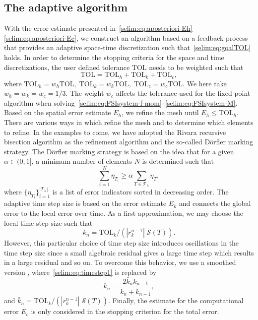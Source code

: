 \subsection{The adaptive algorithm}

With the \apost{} error estimate presented
in~\eqref{selim:eq:aposteriori-Eh}--\eqref{selim:eq:aposteriori-Ec}, we construct an algorithm based on a
feedback process that provides an adaptive space-time discretization
such that~\eqref{selim:eq:goalTOL} holds. In order to determine the
stopping criteria for the space and time discretizations, the user
defined tolerance $\mathrm{TOL}$ needs to be weighted such that
\begin{equation}
\mathrm{TOL} = \mathrm{TOL}_h + \mathrm{TOL}_k + \mathrm{TOL}_c,
\end{equation}
where $\mathrm{TOL}_h = w_h \mathrm{TOL}, \;\mathrm{TOL}_k = w_k
\mathrm{TOL}, \;\mathrm{TOL}_c = w_c \mathrm{TOL}$.  We here take $w_h
= w_k = w_c = 1/3$. The weight $w_c$ affects the tolerance used for
the fixed point algorithm when
solving~\eqref{selim:eq:FSIsystem-f-mom}--\eqref{selim:eq:FSIsystem-M}. Based on the spatial error
estimate $E_h$, we refine the mesh until $E_h \leqslant \mathrm{TOL}_h$.
There are various ways in which refine the mesh and to determine which
elements to refine. In the examples to come, we have adopted the
Rivara recursive bisection algorithm as the refinement algorithm
and the so-called
D\"{o}rfler \citep{Dorfler1996} marking strategy. The D\"{o}rfler
marking strategy is based on the idea that for a given
$\alpha\in(0,1]$, a minimum number of elements $N$ is determined
such that
\begin{equation}
  \label{selim:eq:dorfler}
\sum_{i=1}^{N}\eta_{T_i} \geqslant  \alpha \sum_{T\in\mathcal{T}_h}\eta_T ,
\end{equation}
where $\{ \eta_{T_{i}}\}_{i = 1}^{|\mathcal{T}_h|}$ is a list of error
indicators sorted in decreasing order. The adaptive time step size is
based on the error estimate $E_k$ and connects the global error to the
local error over time. As a first approximation, we may choose the
local time step size such that
\begin{equation}
\label{selim:eq:timestep1}
k_n = \mathrm{TOL}_k /(| r_k^{n-1} |\; \mathcal{S}(T)).
\end{equation}
However, this particular choice of time step size introduces
oscillations in the time step size since a small algebraic residual
gives a large time step which results in a large residual and so
on. To overcome this behavior, we use a smoothed
version \citep{Logg2004}, where~\eqref{selim:eq:timestep1} is replaced
by
\begin{equation}
\label{selim:eq:timestep2}
k_n = \frac{2\bar{k}_n k_{n-1}}{\bar{k}_n + k_{n-1}},
\end{equation}
and $\bar{k}_n = \mathrm{TOL}_k/(| r_k^{n-1} |
\;\mathcal{S}(T))$. Finally, the estimate for the computational error
$E_c$ is only considered in the stopping criterion for the total
error.

